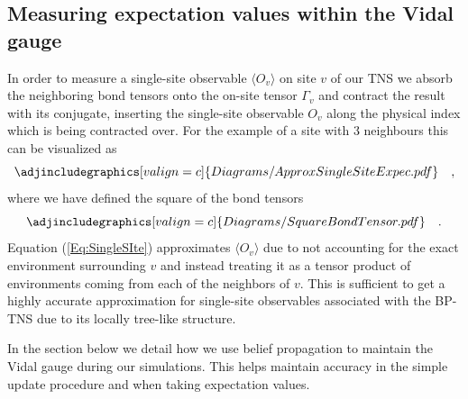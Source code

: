 \documentclass[%
 superscriptaddress,
 amsmath,amssymb,
 prx,
]{revtex4-2}
\begin{document}
\subsection*{Measuring expectation values within the Vidal gauge}
In order to measure a single-site observable $\langle O_{v} \rangle$ on site $v$ of our TNS we absorb the neighboring bond tensors onto the on-site tensor $\Gamma_{v}$ and contract the result with its conjugate, inserting the single-site observable $O_{v}$ along the physical index which is being contracted over.
For the example of a site with $3$ neighbours this can be visualized as
\begin{equation}
    \adjincludegraphics[valign=c]{Diagrams/ApproxSingleSiteExpec.pdf} \quad,
    \label{Eq:SingleSIte}
\end{equation}
where we have defined the square of the bond tensors
\begin{equation}
    \adjincludegraphics[valign=c]{Diagrams/SquareBondTensor.pdf} \quad.
    \label{Eq:SquareBondTensors}
\end{equation}
Equation (\ref{Eq:SingleSIte}) approximates $\langle O_{v} \rangle$ due to not accounting for the exact environment surrounding $v$ and instead treating it as a tensor product of environments coming from each of the neighbors of $v$. This is sufficient to get a highly accurate approximation for single-site observables associated with the BP-TNS due to its locally tree-like structure. 
\par In the section below we detail how we use belief propagation to maintain the Vidal gauge during our simulations. This helps maintain accuracy in the simple update procedure and when taking expectation values.
\end{document}
